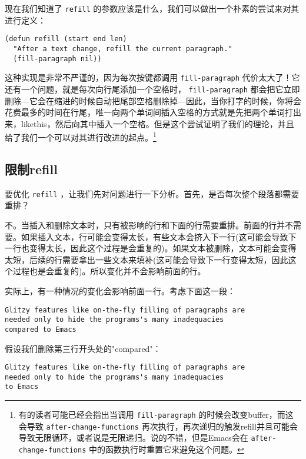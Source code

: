 现在我们知道了 \texttt{refill} 的参数应该是什么，我们可以做出一个朴素的尝试来对其进行定义：

\begin{verbatim}
(defun refill (start end len)
  "After a text change, refill the current paragraph."
  (fill-paragraph nil))
\end{verbatim}

这种实现是非常不严谨的，因为每次按键都调用 \texttt{fill-paragraph} 代价太大了！它还有一个问题，就是每次向行尾添加一个空格时， \texttt{fill-paragraph} 都会把它立即删除---它会在缩进的时候自动把尾部空格删除掉---因此，当你打字的时候，你将会花费最多的时间在行尾，唯一向两个单词间插入空格的方式就是先把两个单词打出来，likethis，然后向其中插入一个空格。但是这个尝试证明了我们的理论，并且给了我们一个可以对其进行改进的起点。\footnote{有的读者可能已经会指出当调用 \texttt{fill-paragraph} 的时候会改变buffer，而这会导致 \texttt{after-change-functions} 再次执行，再次递归的触发refill并且可能会导致无限循环，或者说是无限递归。说的不错，但是Emacs会在 \texttt{after-change-functions} 中的函数执行时重置它来避免这个问题。}

\subsection{限制refill}
\label{section:07-Constraining-refill}

要优化 \texttt{refill} ，让我们先对问题进行一下分析。首先，是否每次整个段落都需要重排？

不。当插入和删除文本时，只有被影响的行和下面的行需要重排。前面的行并不需要。如果插入文本，行可能会变得太长，有些文本会挤入下一行(这可能会导致下一行也变得太长，因此这个过程是会重复的)。如果文本被删除，文本可能会变得太短，后续的行需要拿出一些文本来填补(这可能会导致下一行变得太短，因此这个过程也是会重复的)。所以变化并不会影响前面的行。

实际上，有一种情况的变化会影响前面一行。考虑下面这一段：

\begin{verbatim}
Glitzy features like on-the-fly filling of paragraphs are
needed only to hide the programs's many inadequacies
compared to Emacs
\end{verbatim}

假设我们删除第三行开头处的"compared"：

\begin{verbatim}
Glitzy features like on-the-fly filling of paragraphs are
needed only to hide the programs's many inadequacies
to Emacs
\end{verbatim}

